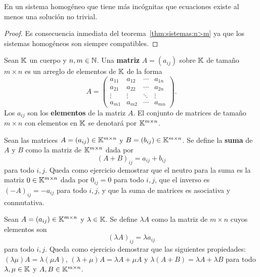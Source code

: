 \begin{cor}
	\label{cor:homogeneo}
	En un sistema homogéneo que tiene más incógnitas que ecuaciones existe al
	menos una solución no trivial.

	\begin{proof}
		Es consecuencia inmediata del teorema~\ref{thm:sistemas:n>m} ya que los
		sistemas homogéneos son siempre compatibles.
	\end{proof}
\end{cor}

\begin{block}
    Sean $\mathbb{K}$ un cuerpo y $n,m\in\mathbb{N}$. Una \textbf{matriz} $A=(a_{ij})$ sobre
    $\mathbb{K}$ de tamaño $m\times n$ es un arreglo de elementos de $\mathbb{K}$ de la forma
	\[
		A=\begin{pmatrix}
			a_{11} & a_{12} & \cdots & a_{1n}\\
			a_{21} & a_{22} & \cdots & a_{2n}\\
			\vdots & \vdots & \ddots & \vdots\\
			a_{m1} & a_{m2} & \cdots & a_{mn}
		\end{pmatrix}.
	\]
	Los $a_{ij}$ son los \textbf{elementos} de la matriz $A$.  El conjunto de
	matrices de tamaño $m\times n$ con elementos en $\mathbb{K}$ se denotará por
	$\mathbb{K}^{m\times n}$.
\end{block}

\begin{block}
    Sean las matrices $A=(a_{ij})\in\mathbb{K}^{m\times n}$ y $B=(b_{ij})\in\mathbb{K}^{m\times
    n}$. Se define la \textbf{suma} de $A$ y $B$ como la matriz de $\mathbb{K}^{m\times
    n}$ dada por 
	\[
		(A+B)_{ij}=a_{ij}+b_{ij}
	\]
    para todo $i,j$.  Queda como ejercicio demostrar que el neutro para la suma
    es la matriz $0\in\mathbb{K}^{m\times n}$ dada por $0_{ij}=0$ para todo $i,j$, que
    el inverso es $(-A)_{ij}=-a_{ij}$ para todo $i,j$, y que la suma de
    matrices es asociativa y conmutativa. 
\end{block}

\begin{block}
    Sean $A=(a_{ij})\in\mathbb{K}^{m\times n}$ y $\lambda\in\mathbb{K}$. Se define $\lambda A$ como la
	matriz de $m\times n$ cuyos elementos son 
	\[
		(\lambda A)_{ij}=\lambda a_{ij}
	\]
    para todo $i,j$. Queda como ejercicio demostrar que las siguientes
    propiedades: $(\lambda\mu)A=\lambda(\mu A)$, $(\lambda+\mu)A=\lambda A+\mu
    A$ y $\lambda(A+B)=\lambda A+\lambda B$ para todo $\lambda,\mu\in\mathbb{K}$ y
    $A,B\in\mathbb{K}^{m\times n}$.
\end{block}

